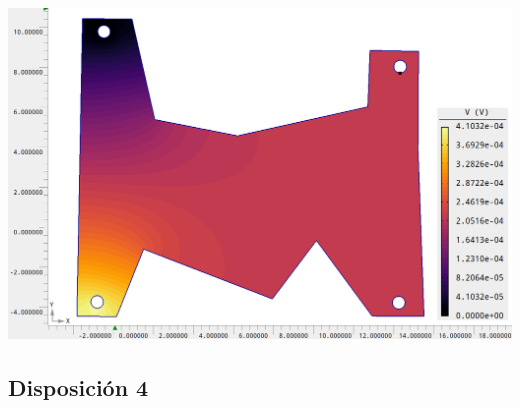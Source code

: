 \documentclass[11pt]{article}
\begin{document}



\begin{minipage}[t]{0.45\linewidth} 
	\begin{center}
	\vspace{0.5em}
	
	\vspace{1.2em}
	\vspace{0.5em}
	
	\end{center}  
\end{minipage}
\hfill
\begin{minipage}[t]{0.45\linewidth}
	\begin{center}
	\label{Fig:05}
	\includegraphics[width=1\linewidth]{Imagen Agros 1/Agros3.png}
	\end{center}  	
\end{minipage}

\subsection{Disposición 4}





\end{document}
